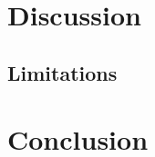 \documentclass[12pt,a4paper]{report}
\begin{document}
\chapter{Discussion}
\label{ch:discussion}

\section{Limitations}
\label{sec:limitations}


\chapter{Conclusion}
\label{ch:conclusion}






\appendix
\end{document}
